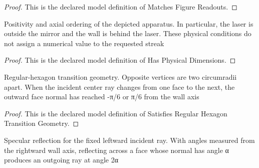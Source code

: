 \begin{proof}
  This is the declared model definition of Matches Figure Readouts.
\end{proof}
\begin{definition}
  \label{def:physics:phyx-mini-0062:phyxminiproblems-problemphyxmini0062-hasphysicaldimensions}
  Positivity and axial ordering of the depicted apparatus. In particular, the laser is outside the mirror and the wall is behind the laser. These physical conditions do not assign a numerical value to the requested streak
\end{definition}
\begin{proof}
  This is the declared model definition of Has Physical Dimensions.
\end{proof}
\begin{definition}
  \label{def:physics:phyx-mini-0062:phyxminiproblems-problemphyxmini0062-satisfiesregularhexagontransitiongeometry}
  Regular-hexagon transition geometry. Opposite vertices are two circumradii apart. When the incident center ray changes from one face to the next, the outward face normal has reached -π/6 or π/6 from the wall axis
\end{definition}
\begin{proof}
  This is the declared model definition of Satisfies Regular Hexagon Transition Geometry.
\end{proof}
\begin{definition}
  \label{def:physics:phyx-mini-0062:phyxminiproblems-problemphyxmini0062-satisfieslawofspecularreflection}
  Specular reflection for the fixed leftward incident ray. With angles measured from the rightward wall axis, reflecting across a face whose normal has angle α produces an outgoing ray at angle 2α
\end{definition}
